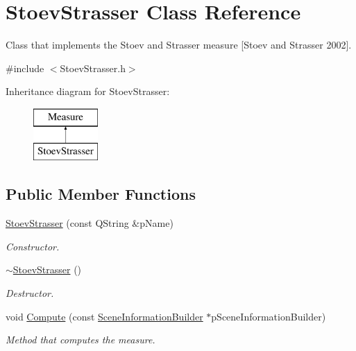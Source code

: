 \hypertarget{class_stoev_strasser}{\section{Stoev\+Strasser Class Reference}
\label{class_stoev_strasser}
}


Class that implements the Stoev and Strasser measure \mbox{[}Stoev and Strasser 2002\mbox{]}.  




{\ttfamily \#include $<$Stoev\+Strasser.\+h$>$}

Inheritance diagram for Stoev\+Strasser\+:\begin{figure}[H]
\begin{center}
\leavevmode
\includegraphics[height=2.000000cm]{class_stoev_strasser}
\end{center}
\end{figure}
\subsection*{Public Member Functions}
\begin{DoxyCompactItemize}
\item 
\hyperlink{class_stoev_strasser_aa671f75420b0c973d311a4d96c625db8}{Stoev\+Strasser} (const Q\+String \&p\+Name)
\begin{DoxyCompactList}\small\item\em Constructor. \end{DoxyCompactList}\item 
\hyperlink{class_stoev_strasser_aeb82ff6ec419b248c922575dded53dad}{$\sim$\+Stoev\+Strasser} ()
\begin{DoxyCompactList}\small\item\em Destructor. \end{DoxyCompactList}\item 
void \hyperlink{class_stoev_strasser_ad30bd5fd1ada91b99235297aba1e4517}{Compute} (const \hyperlink{class_scene_information_builder}{Scene\+Information\+Builder} $\ast$p\+Scene\+Information\+Builder)
\begin{DoxyCompactList}\small\item\em Method that computes the measure. \end{DoxyCompactList}\end{DoxyCompactItemize}
